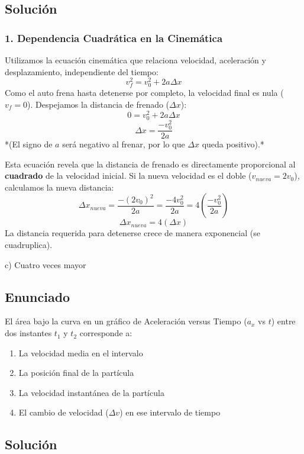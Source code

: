\documentclass[12pt, a4paper]{article}
\begin{document}
\subsection*{Solución}

\subsubsection*{1. Dependencia Cuadrática en la Cinemática}
Utilizamos la ecuación cinemática que relaciona velocidad, aceleración y desplazamiento, independiente del tiempo:
$$ v_f^2 = v_0^2 + 2a\Delta x $$
Como el auto frena hasta detenerse por completo, la velocidad final es nula ($v_f = 0$). Despejamos la distancia de frenado ($\Delta x$):
$$ 0 = v_0^2 + 2a\Delta x $$
$$ \Delta x = \frac{-v_0^2}{2a} $$
*(El signo de $a$ será negativo al frenar, por lo que $\Delta x$ queda positivo).*

Esta ecuación revela que la distancia de frenado es directamente proporcional al \textbf{cuadrado} de la velocidad inicial. 
Si la nueva velocidad es el doble ($v_{nueva} = 2v_0$), calculamos la nueva distancia:
$$ \Delta x_{nueva} = \frac{-(2v_0)^2}{2a} = \frac{-4v_0^2}{2a} = 4 \left( \frac{-v_0^2}{2a} \right) $$
$$ \Delta x_{nueva} = 4 (\Delta x) $$
La distancia requerida para detenerse crece de manera exponencial (se cuadruplica).

\begin{tcolorbox}[colback=green!5!white, colframe=green!50!black, title=Respuesta Final]
\centering \Large c) Cuatro veces mayor
\end{tcolorbox}

\newpage

\subsection*{Enunciado}
El área bajo la curva en un gráfico de Aceleración versus Tiempo ($a_x$ vs $t$) entre dos instantes $t_1$ y $t_2$ corresponde a:
\begin{enumerate}[label=\alph*)]
    \item La velocidad media en el intervalo
    \item La posición final de la partícula
    \item La velocidad instantánea de la partícula
    \item El cambio de velocidad ($\Delta v$) en ese intervalo de tiempo
\end{enumerate}

\subsection*{Solución}
\end{document}
